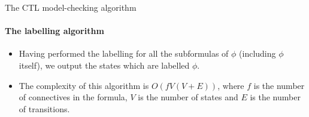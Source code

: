 \begin{frame}{The CTL model-checking algorithm}
	\framesubtitle{The labelling algorithm}
	\begin{itemize}
		\item
		{
			Having performed the labelling for all the subformulas of $\phi$ (including $\phi$
			itself), we output the states which are labelled $\phi$.
			\pause
		}
		\item
		{
			The complexity of this algorithm is $O(f V (V + E))$, where $f$ is the number of connectives in the formula, $V$ is the number of states and $E$ is the number of transitions.
		}
	\end{itemize}
\end{frame}